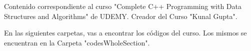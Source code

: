 Contenido correspondiente al curso "Complete C++ Programming with Data Structures and Algorithms" de UDEMY.
Creador del Curso "Kunal Gupta".

En las siguientes carpetas, vas a encontrar los códigos del curso. Los mismos se encuentran en la Carpeta "codesWholeSection".

